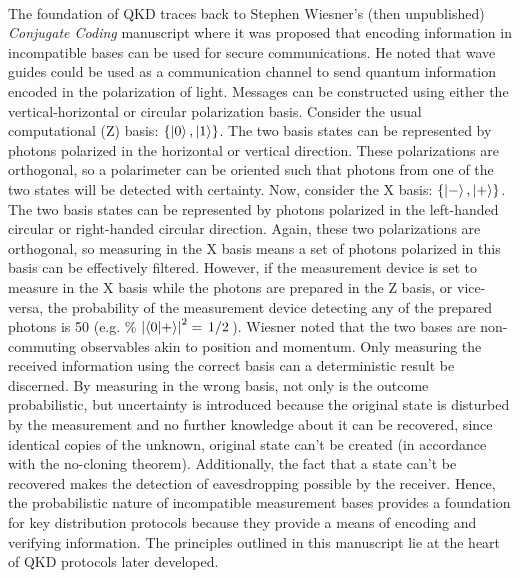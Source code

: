 \documentclass[12pt,a4paper]{article}
\begin{document}
 	\paragraph{}
 	The foundation of QKD traces back to Stephen Wiesner's (then unpublished) \textit{Conjugate Coding} manuscript where it was proposed that encoding information in incompatible bases can be used for secure communications. He noted that wave guides could be used as a communication channel to send quantum information encoded in the polarization of light. Messages can be constructed using either the vertical-horizontal or circular polarization basis. Consider the usual computational (Z) basis: $\left\{\ket{0}, \ket{1}\right\}$. The two basis states can be represented by photons polarized in the horizontal or vertical direction. These polarizations are orthogonal, so a polarimeter can be oriented such that photons from one of the two states will be detected with certainty. Now, consider the X basis: $\left\{\ket{-}, \ket{+}\right\}$. The two basis states can be represented by photons polarized in the left-handed circular or right-handed circular direction. Again, these two polarizations are orthogonal, so measuring in the X basis means a set of photons polarized in this basis can be effectively filtered. However, if the measurement device is set to measure in the X basis while the photons are prepared in the Z basis, or vice-versa, the probability of the measurement device detecting any of the prepared photons is 50 (e.g. \% $\abs{\bra{0}\ket{+}}^2 = \flatfrac{1}{2}$). Wiesner noted that the two bases are non-commuting observables akin to position and momentum. Only measuring the received information using the correct basis can a deterministic result be discerned. By measuring in the wrong basis, not only is the outcome probabilistic, but uncertainty is introduced because the original state is disturbed by the measurement and no further knowledge about it can be recovered, since identical copies of the unknown, original state can't be created (in accordance with the no-cloning theorem). Additionally, the fact that a state can't be recovered makes the detection of eavesdropping possible by the receiver. Hence, the probabilistic nature of incompatible measurement bases provides a foundation for key distribution protocols because they provide a means of encoding and verifying information. The principles outlined in this manuscript lie at the heart of QKD protocols later developed. %
\end{document}
